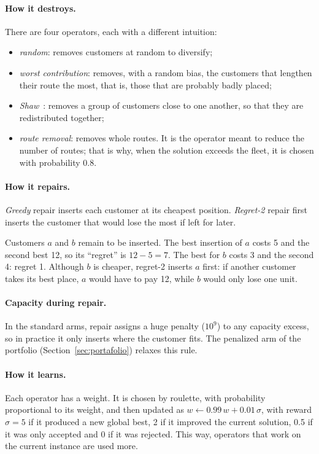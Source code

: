 \documentclass[11pt,a4paper]{article}
\begin{document}
\paragraph{How it destroys.} There are four operators, each with a different intuition:
\begin{itemize}[leftmargin=1.5em]
\item \emph{random}: removes customers at random to diversify;
\item \emph{worst contribution}: removes, with a random bias, the customers that lengthen their route
the most, that is, those that are probably badly placed;
\item \emph{Shaw}~\cite{shaw1998}: removes a group of customers close to one another, so that they
are redistributed together;
\item \emph{route removal}: removes whole routes. It is the operator meant to reduce the number of
routes; that is why, when the solution exceeds the fleet, it is chosen with probability 0.8.
\end{itemize}

\paragraph{How it repairs.} \emph{Greedy} repair inserts each customer at its cheapest position.
\emph{Regret-2} repair first inserts the customer that would lose the most if left for later.

\begin{ejemplo}
Customers $a$ and $b$ remain to be inserted. The best insertion of $a$ costs 5 and the second best
12, so its ``regret'' is $12-5=7$. The best for $b$ costs 3 and the second 4: regret 1. Although $b$
is cheaper, regret-2 inserts $a$ first: if another customer takes its best place, $a$ would have to
pay 12, while $b$ would only lose one unit.
\end{ejemplo}

\paragraph{Capacity during repair.} In the standard arms, repair assigns a huge penalty ($10^9$) to
any capacity excess, so in practice it only inserts where the customer fits. The penalized arm of the
portfolio (Section~\ref{sec:portafolio}) relaxes this rule.

\paragraph{How it learns.} Each operator has a weight. It is chosen by roulette, with probability
proportional to its weight, and then updated as $w\leftarrow0.99\,w+0.01\,\sigma$, with reward
$\sigma=5$ if it produced a new global best, 2 if it improved the current solution, 0.5 if it was
only accepted and 0 if it was rejected. This way, operators that work on the current instance are
used more.
\end{document}
